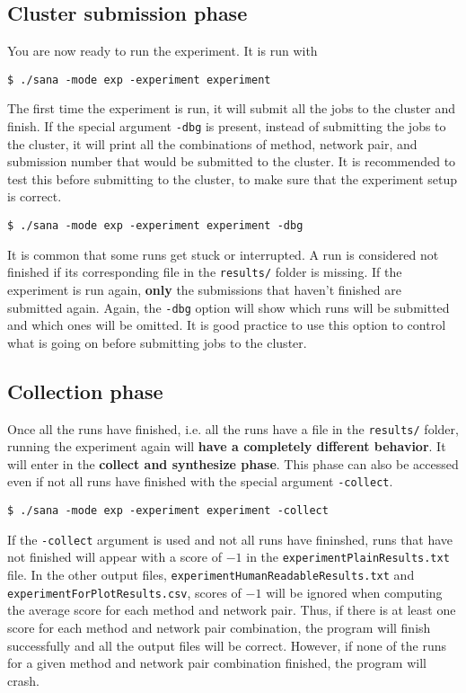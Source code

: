 \documentclass[]{article}
\begin{document}
\subsection{Cluster submission phase}
You are now ready to run the experiment. It is run with
\begin{verbatim}
$ ./sana -mode exp -experiment experiment
\end{verbatim}
The first time the experiment is run, it will submit all the jobs to the cluster and finish. If the special argument \verb|-dbg| is present, instead of submitting the jobs to the cluster, it will print all the combinations of method, network pair, and submission number that would be submitted to the cluster. It is recommended to test this before submitting to the cluster, to make sure that the experiment setup is correct.
\begin{verbatim}
$ ./sana -mode exp -experiment experiment -dbg
\end{verbatim}
It is common that some runs get stuck or interrupted. A run is considered not finished if its corresponding file in the \verb|results/| folder is missing. If the experiment is run again, \textbf{only} the submissions that haven't finished are submitted again. Again, the \verb|-dbg| option will show which runs will be submitted and which ones will be omitted. It is good practice to use this option to control what is going on before submitting jobs to the cluster.
\subsection{Collection phase}
Once all the runs have finished, i.e. all the runs have a file in the \verb|results/| folder, running the experiment again will \textbf{have a completely different behavior}. It will enter in the \textbf{collect and synthesize phase}. This phase can also be accessed even if not all runs have finished with the special argument \verb|-collect|.
\begin{verbatim}
$ ./sana -mode exp -experiment experiment -collect
\end{verbatim}
If the \verb|-collect| argument is used and not all runs have fininshed, runs that have not finished will appear with a score of $-1$ in the \verb|experimentPlainResults.txt| file. In the other output files, \verb|experimentHumanReadableResults.txt| and \verb|experimentForPlotResults.csv|, scores of $-1$ will be ignored when computing the average score for each method and network pair. Thus, if there is at least one score for each method and network pair combination, the program will finish successfully and all the output files will be correct. However, if none of the runs for a given method and network pair combination finished, the program will crash.
\end{document}
